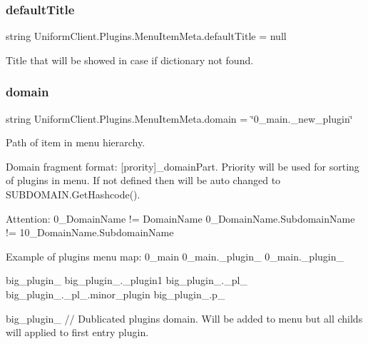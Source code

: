 \subsubsection{\texorpdfstring{default\+Title}{defaultTitle}}
{\footnotesize\ttfamily string Uniform\+Client.\+Plugins.\+Menu\+Item\+Meta.\+default\+Title = null}



Title that will be showed in case if dictionary not found. 

\mbox{\label{class_uniform_client_1_1_plugins_1_1_menu_item_meta_a5af82221a6390db0d98c7fe9ff1d1985}} 
\subsubsection{\texorpdfstring{domain}{domain}}
{\footnotesize\ttfamily string Uniform\+Client.\+Plugins.\+Menu\+Item\+Meta.\+domain = \char`\"{}0\+\_\+main.\+\_\+new\+\_\+plugin\char`\"{}}



Path of item in menu hierarchy. 

Domain fragment format\+: \mbox{[}prority\mbox{]}\+\_\+domain\+Part. Priority will be used for sorting of plugins in menu. If not defined then will be auto changed to S\+U\+B\+D\+O\+M\+A\+I\+N.\+Get\+Hashcode().

Attention\+: 0\+\_\+\+Domain\+Name != Domain\+Name 0\+\_\+\+Domain\+Name.\+Subdomain\+Name != 10\+\_\+\+Domain\+Name.\+Subdomain\+Name

Example of plugins menu map\+: 0\+\_\+main 0\+\_\+main.\+\_\+plugin\+\_ 0\+\_\+main.\+\_\+plugin\+\_

big\+\_\+plugin\+\_ big\+\_\+plugin\+\_.\+\_\+plugin1 big\+\_\+plugin\+\_.\+\_\+pl\+\_ big\+\_\+plugin\+\_.\+\_\+pl\+\_.\+minor\+\_\+plugin big\+\_\+plugin\+\_.\+p\+\_

big\+\_\+plugin\+\_ // Dublicated plugin\textquotesingle{}s domain. Will be added to menu but all childs will applied to first entry plugin. \mbox{\label{class_uniform_client_1_1_plugins_1_1_menu_item_meta_a7cd04fb564fa2bdd1ac3c0c3af3b9aab}} 
